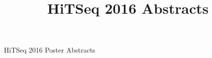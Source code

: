 \documentclass[11pt]{article}
\date{}
\author{}
\title{
  HiTSeq 2016 Abstracts
}
\begin{document}

\begin{center}

\vspace*{5cm}
\Huge{HiTSeq 2016 Poster Abstracts}
\end{center}

\newpage


  \clearpage 
  \clearpage 
  \clearpage 
  \clearpage 
  \clearpage 
  \clearpage 
\end{document}
